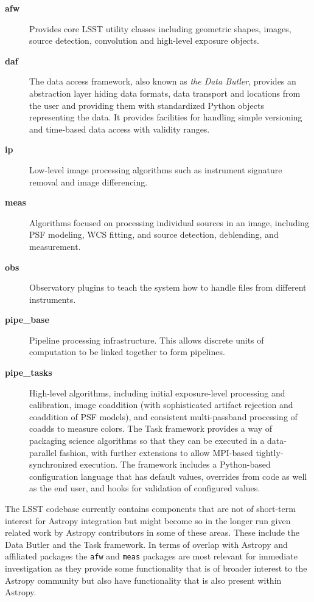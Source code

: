 \documentclass[]{spie}  %
\begin{document}
\begin{description}
\item[\textbf{afw}] Provides core LSST utility classes including geometric shapes, images, source detection, convolution and high-level exposure objects.

\item[\textbf{daf}] The data access framework, also known as \emph{the Data Butler}, provides an abstraction layer hiding data formats, data transport and locations from the user and providing them with standardized Python objects representing the data.
It provides facilities for handling simple versioning and time-based data access with validity ranges.

\item[\textbf{ip}] Low-level image processing algorithms such as instrument signature removal and image differencing.

\item[\textbf{meas}] Algorithms focused on processing individual sources in an image, including PSF modeling, WCS fitting, and source detection, deblending, and measurement.

\item[\textbf{obs}] Observatory plugins to teach the system how to handle files from different instruments.

\item[\textbf{pipe\_base}] Pipeline processing infrastructure. This allows discrete units of computation to be linked together to form pipelines.

\item[\textbf{pipe\_tasks}] High-level algorithms, including initial exposure-level processing and calibration, image coaddition (with sophisticated artifact rejection and coaddition of PSF models), and consistent multi-passband processing of coadds to measure colors.
The Task framework provides a way of packaging science algorithms so that they can be executed in a data-parallel fashion, with further extensions to allow MPI-based tightly-synchronized execution.
The framework includes a Python-based configuration language that has default values, overrides from code as well as the end user, and hooks for validation of configured values.

\end{description}

The LSST codebase currently contains components that are not of short-term interest for Astropy integration but might become so in the longer run given related work by Astropy contributors in some of these areas\cite{2016-PyAstro-Turner,2016_O12.3_adassxxv,2015_scipy_bushouse}.
These include the Data Butler and the Task framework.
In terms of overlap with Astropy and affiliated packages the \texttt{afw} and \texttt{meas} packages are most relevant for immediate investigation as they provide some functionality that is of broader interest to the Astropy community but also have functionality that is also present within Astropy.
\end{document}
